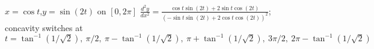 {$x=\cos t$,\quad  $y=\sin(2t)$ on $[0,2\pi]$}
{$\frac{d^2y}{dx^2}=\frac{\cos t\sin (2t)+2\sin t\cos(2t)}{(-\sin t\sin(2t)+2\cos t\cos(2t))^2}$; concavity switches at $t=\tan^{-1}(1/\sqrt{2}),\ \pi/2,\ \pi-\tan^{-1}(1/\sqrt{2}),\ \pi+\tan^{-1}(1/\sqrt{2}),\ 3\pi/2,\ 2\pi-\tan^{-1}(1/\sqrt{2})$}

